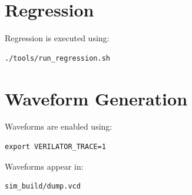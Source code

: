 \documentclass[11pt]{article}
\begin{document}
\section{Regression}
Regression is executed using:
\begin{verbatim}
./tools/run_regression.sh
\end{verbatim}

\section{Waveform Generation}
Waveforms are enabled using:
\begin{verbatim}
export VERILATOR_TRACE=1
\end{verbatim}

Waveforms appear in:
\begin{verbatim}
sim_build/dump.vcd
\end{verbatim}
\end{document}
